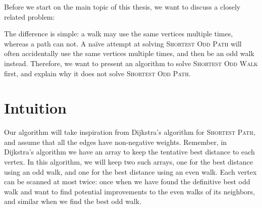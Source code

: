 Before we start on the main topic of this thesis, we want to discuss a closely related problem:

\noindent{}

The difference is simple: a walk may use the same vertices multiple times, whereas a path can not. A naïve attempt at solving \textsc{Shortest Odd Path} will often accidentally use the same vertices multiple times, and then be an odd walk instead. Therefore, we want to present an algorithm to solve \textsc{Shortest Odd Walk} first, and explain why it does not solve \textsc{Shortest Odd Path}.

\section{Intuition}
Our algorithm will take inspiration from Dijkstra's algorithm for \textsc{Shortest Path}, and assume that all the edges have non-negative weights. Remember, in Dijkstra's algorithm we have an array to keep the tentative best distance to each vertex. In this algorithm, we will keep two such arrays, one for the best distance using an odd walk, and one for the best distance using an even walk. Each vertex can be scanned at most twice: once when we have found the definitive best odd walk and want to find potential improvements to the even walks of its neighbors, and similar when we find the best odd walk.

